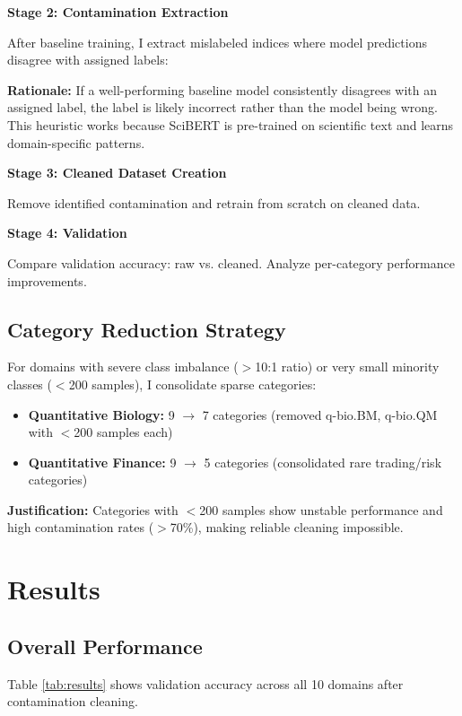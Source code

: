 \documentclass{article}
\begin{document}
\textbf{Stage 2: Contamination Extraction}

After baseline training, I extract mislabeled indices where model predictions disagree with assigned labels:

\textbf{Rationale:} If a well-performing baseline model consistently disagrees with an assigned label, the label is likely incorrect rather than the model being wrong. This heuristic works because SciBERT is pre-trained on scientific text and learns domain-specific patterns.

\textbf{Stage 3: Cleaned Dataset Creation}

Remove identified contamination and retrain from scratch on cleaned data.

\textbf{Stage 4: Validation}

Compare validation accuracy: raw vs. cleaned. Analyze per-category performance improvements.

\subsection{Category Reduction Strategy}

For domains with severe class imbalance ($>$10:1 ratio) or very small minority classes ($<$200 samples), I consolidate sparse categories:

\begin{itemize}
    \item \textbf{Quantitative Biology:} 9 $\rightarrow$ 7 categories (removed q-bio.BM, q-bio.QM with $<$200 samples each)
    \item \textbf{Quantitative Finance:} 9 $\rightarrow$ 5 categories (consolidated rare trading/risk categories)
\end{itemize}

\textbf{Justification:} Categories with $<$200 samples show unstable performance and high contamination rates ($>$70\%), making reliable cleaning impossible.

\section{Results}

\subsection{Overall Performance}

Table \ref{tab:results} shows validation accuracy across all 10 domains after contamination cleaning.
\end{document}

